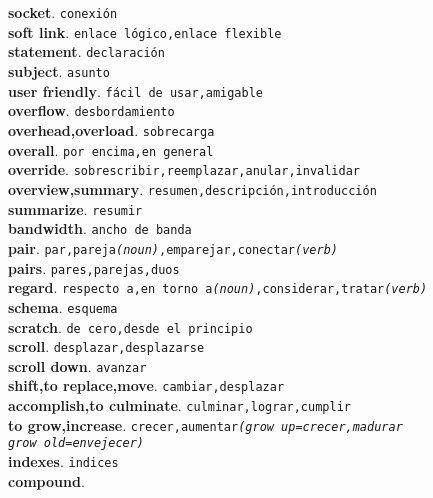 \documentclass[twocolumn]{article}
\begin{document}
	\textsf{\textbf{socket}}. \texttt{conexi\'on}\\
	\textsf{\textbf{soft link}}. \texttt{enlace l\'ogico,enlace flexible}\\
	\textsf{\textbf{statement}}. \texttt{declaraci\'on}\\
	\textsf{\textbf{subject}}. \texttt{asunto}\\
	\textsf{\textbf{user friendly}}. \texttt{f\'acil de usar,amigable}\\
	\textsf{\textbf{overflow}}. \texttt{desbordamiento}\\
	\textsf{\textbf{overhead,overload}}. \texttt{sobrecarga}\\
	\textsf{\textbf{overall}}. \texttt{por encima,en general}\\
	\textsf{\textbf{override}}. \texttt{sobrescribir,reemplazar,anular,invalidar}\\
	\textsf{\textbf{overview,summary}}. \texttt{resumen,descripci\'on,introducci\'on}\\
	\textsf{\textbf{summarize}}. \texttt{resumir}\\
	\textsf{\textbf{bandwidth}}. \texttt{ancho de banda}\\
	\textsf{\textbf{pair}}. \texttt{par,pareja{\scriptsize \textsl{(noun)}},emparejar,conectar{\scriptsize \textsl{(verb)}}}\\
	\textsf{\textbf{pairs}}. \texttt{pares,parejas,duos}\\
	\textsf{\textbf{regard}}. \texttt{respecto a,en torno a{\scriptsize \textsl{(noun)}},considerar,tratar{\scriptsize \textsl{(verb)}}}\\
	\textsf{\textbf{schema}}. \texttt{esquema}\\
	\textsf{\textbf{scratch}}. \texttt{de cero,desde el principio}\\
	\textsf{\textbf{scroll}}. \texttt{desplazar,desplazarse}\\
	\textsf{\textbf{scroll down}}. \texttt{avanzar}\\
	\textsf{\textbf{shift,to replace,move}}. \texttt{cambiar,desplazar}\\
	\textsf{\textbf{accomplish,to culminate}}. \texttt{culminar,lograr,cumplir}\\
	\textsf{\textbf{to grow,increase}}. \texttt{crecer,aumentar{\scriptsize \textsl{(grow up=crecer,madurar\\grow old=envejecer)}}}\\
	\textsf{\textbf{indexes}}. \texttt{indices}\\
	\textsf{\textbf{compound}}.\\
\end{document}
